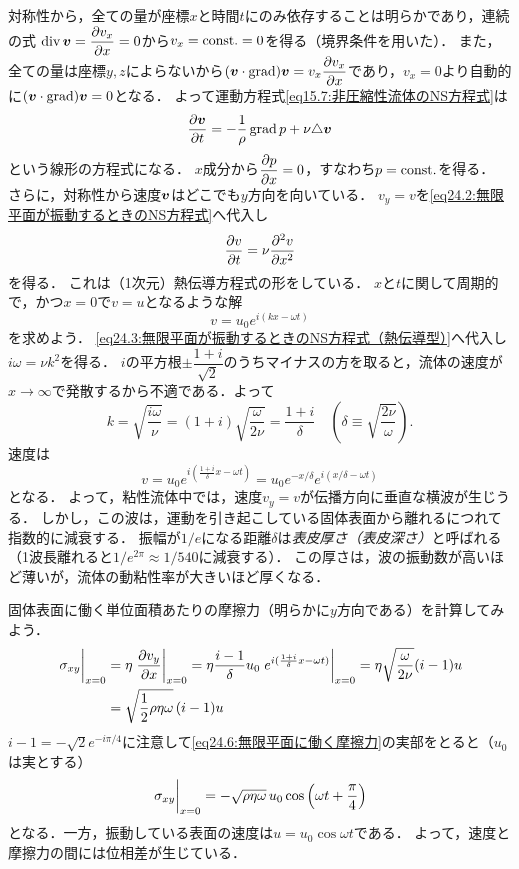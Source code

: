 対称性から，全ての量が座標$x$と時間$t$にのみ依存することは明らかであり，連続の式
$\Div \v = \dpdv{v_x}{x} = 0$から$v_x = \mathrm{const.} = 0$を得る（境界条件を用いた）．
また，全ての量は座標$y,z$によらないから$(\v\cdot\Grad)\v = v_x \dpdv{v_x}{x}$であり，$v_x=0$より自動的に$(\vb*{v}\cdot\operatorname{grad})\vb*{v} = 0$となる．
よって運動方程式\eqref{eq15.7:非圧縮性流体のNS方程式}は
\begin{equation}\label{eq24.2:無限平面が振動するときのNS方程式}
    \pdv{\vb*{v}}{t} = - \frac{1}{\rho} \operatorname{grad} p + \nu \triangle \vb*{v}
\end{equation}
という線形の方程式になる．
$x$成分から$\dpdv{p}{x}=0$，すなわち$p=\mathrm{const.}$を得る．
さらに，対称性から速度$\vb*{v}$はどこでも$y$方向を向いている．
$v_y=v$を\eqref{eq24.2:無限平面が振動するときのNS方程式}へ代入し
\begin{equation}\label{eq24.3:無限平面が振動するときのNS方程式（熱伝導型）}
    \pdv{v}{t} = \nu \pdv[2]{v}{x}
\end{equation}
を得る．
これは（1次元）熱伝導方程式の形をしている．
$x$と$t$に関して周期的で，かつ$x=0$で$v=u$となるような解
\[
    v = u_0 e^{i(kx-\omega t)}
\]
を求めよう．
\eqref{eq24.3:無限平面が振動するときのNS方程式（熱伝導型）}へ代入し$i\omega=\nu k^2$を得る．
$i$の平方根$\pm\dfrac{1+i}{\sqrt{2}}$のうちマイナスの方を取ると，流体の速度が$x\to\infty$で発散するから不適である．よって
\begin{equation}
    k = \sqrt{\frac{i\omega}{\nu}} = (1+i) \sqrt{\frac{\omega}{2\nu}}
    = \frac{1+i}{\delta} \quad \left( \delta \equiv \sqrt{\frac{2\nu}{\omega}} \right) .
\end{equation}
速度は
\begin{equation}
    v = u_0 e^{i(\frac{1+i}{\delta}x-\omega t)} = u_0 e^{-x/\delta} e^{i(x/\delta-\omega t)}
\end{equation}
となる．
よって，粘性流体中では，速度$v_y=v$が伝播方向に垂直な横波が生じうる．
しかし，この波は，運動を引き起こしている固体表面から離れるにつれて指数的に減衰する．
振幅が$1/e$になる距離$\delta$は\emph{表皮厚さ（表皮深さ）}と呼ばれる（1波長離れると$1/e^{2\pi} \approx 1/540$に減衰する）．
この厚さは，波の振動数が高いほど薄いが，流体の動粘性率が大きいほど厚くなる．


固体表面に働く単位面積あたりの摩擦力（明らかに$y$方向である）を計算してみよう．
\begin{align}
    \eval{\sigma_{xy}}_{x=0} &= \eta \eval{\pdv{v_y}{x}}_{x=0} = \eta \frac{i-1}{\delta} u_0 \eval{ e^{i(\frac{1+i}{\delta}x-\omega t)} }_{x=0} = \eta \sqrt{\frac{\omega}{2\nu}} (i-1) u \notag \\
    &= \sqrt{\frac{1}{2}\rho\eta\omega} \, (i-1) u \label{eq24.6:無限平面に働く摩擦力}
\end{align}
$i-1=-\sqrt{2}e^{-i\pi/4}$に注意して\eqref{eq24.6:無限平面に働く摩擦力}の実部をとると（$u_0$は実とする）
\[
    \eval{\sigma_{xy}}_{x=0} = - \sqrt{\rho\eta\omega} \, u_0 \cos \left( \omega t + \frac{\pi}{4} \right) 
\]
となる．一方，振動している表面の速度は$u=u_0 \cos \omega t$である．
よって，速度と摩擦力の間には位相差が生じている．

